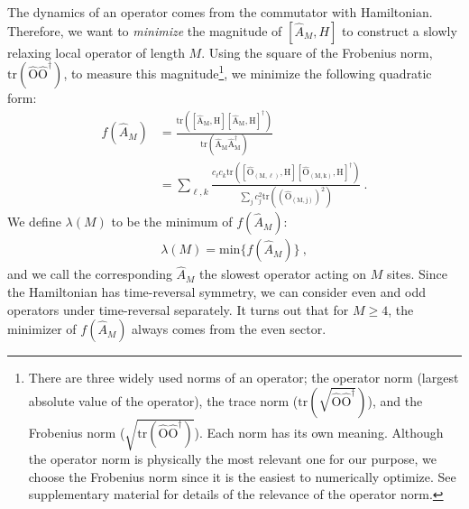 \documentclass[twocolumn,superscriptaddress, prb]{revtex4-1}
\begin{document}
The dynamics of an operator comes from the commutator with Hamiltonian.
Therefore, we want to {\it minimize} the magnitude of $[\hat{A}_M, H]$
to construct a slowly relaxing local operator of length $M$.
Using the square of the Frobenius norm, $\mathrm{tr(\hat{O}\hat{O}^\dag)}$, to measure this magnitude\footnote{There are three widely used norms of an operator;
the operator norm (largest absolute value of the operator), the trace norm ($\mathrm{tr(\sqrt{\hat{O}\hat{O}^\dag})}$),
and the Frobenius norm ($\sqrt{\mathrm{tr(\hat{O}\hat{O}^\dag)}}$). Each norm has its own meaning.
Although the operator norm is physically the most relevant one for our purpose,
we choose the Frobenius norm since it is the easiest to numerically optimize.
See supplementary material for details of the relevance of the operator norm.},
we minimize the following quadratic form:
\begin{align}\label{eq:minimize}
f(\hat{A}_M) &= \frac{\mathrm{tr([\hat{A}_M,H][\hat{A}_M,H]^\dag)}}{\mathrm{tr(\hat{A}_M\hat{A}^\dag_M)}} \nonumber\\
&= \sum_{\ell,k}\frac{c_\ell c_k \mathrm{tr([\hat{O}_{(M,\ell)},H][\hat{O}_{(M,k)},H]^\dag)}}{\sum_j c_j ^2 \mathrm{tr((\hat{O}_{(M,j)})^2)}} ~.
\end{align}
We define $\lambda(M)$ to be the minimum of $f(\hat{A}_M)$:
\begin{align}
\lambda(M) = \mathrm{min}\{f(\hat{A}_M)\} ~,
\end{align}
and we call the corresponding $\hat{A}_M$ the slowest operator acting on $M$ sites.
Since the Hamiltonian has time-reversal symmetry,
we can consider even and odd operators under time-reversal separately.
It turns out that for $M\geq 4$, the minimizer of $f(\hat{A}_M)$ always comes from the even sector.
\end{document}
